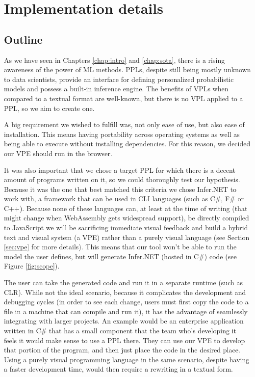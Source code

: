 \chapter{Implementation details}\label{chap:chap3}

\section{Outline}

As we have seen in Chapters \ref{chap:intro} and \ref{chap:sota}, there is a
rising awareness of the power of ML methods. PPLs, despite still being mostly
unknown to data scientists, provide an interface for defining personalized
probabilistic models and possess a built-in inference engine.
The benefits of VPLs when compared to a textual format are well-known, but there
is no VPL applied to a PPL, so we aim to create one.

A big requirement we wished to fulfill was, not only ease of use, but also ease
of installation. This means having portability across operating systems as well
as being able to execute without installing dependencies. For this reason, we
decided our VPE should run in the browser.

It was also important that we chose
a target PPL for which there is a decent amount of programs written on it, so we
could thoroughly test our hypothesis. Because it was the one
that best matched this criteria we chose Infer.NET to work with, a framework that
can be used in CLI languages (such as C#, F# or C++). Because none of these
languages can, at least at the time of writing (that might change when WebAssembly
\cite{weba} gets widespread support), be directly compiled to JavaScript
we will be sacrificing immediate
visual feedback and build a hybrid text and visual system (a VPE) rather than a purely
visual language (see Section \ref{sec:vpe} for more details). This means that
our tool won't be able to run the model the user defines, but will generate
Infer.NET (hosted in C#) code (see Figure \ref{fig:scope}).

The user can take the generated
code and run it in a separate runtime (such as CLR). While not the ideal scenario, because it
complicates the development and debugging cycles (in order to see each change,
users must first copy the code to a file in a machine that can compile and run it),
it has the advantage of seamlessly integrating with larger projects. An example
would be an enterprise application written in C# that has a small component
that the team who's developing it feels it would make sense to use a PPL there.
They can use our VPE to develop that portion of the program, and then just place
the code in the desired place. Using a purely visual programming language in the
same scenario, despite having a faster development time, would then require
a rewriting in a textual form.

